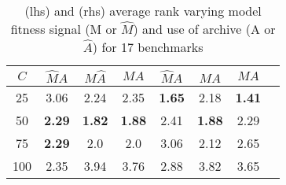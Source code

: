 
\begin{table*}[ht]
\centering
\small
\begin{tabular}{ c | c c c ||  c c c c }
 $C$& $\hat M A$ & $M \hat A$ & $MA$ & $\hat M A$ & $M \hat A$ & $MA$\\ \hline
 25 & 3.06 & 2.24 & 2.35 & \textbf{1.65} & 2.18 & \textbf{1.41} \\
 50 & \textbf{2.29} & \textbf{1.82} & \textbf{1.88} & 2.41 & \textbf{1.88} & 2.29 \\
 75 & \textbf{2.29} & 2.0 & 2.0 & 3.06 & 2.12 & 2.65 \\
 100 & 2.35 & 3.94 & 3.76 &2.88 & 3.82 & 3.65  \\
\end{tabular}
\caption{\DRAW (lhs) and \FULL (rhs) average rank varying model fitness signal (M or $\hat M$) and use of archive (A or $\hat A$) for 17 benchmarks}
\label{table:XXdraws_avg_ranks}
\end{table*}

